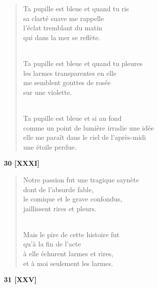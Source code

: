 \documentclass[a4paper,12pt]{book}
\begin{document}
\begin{verse}
Ta pupille est bleue et quand tu ris \\
sa clarté suave me rappelle \\
l'éclat tremblant du matin \\
qui dans la mer se reflète. \\ \

Ta pupille est bleue et quand tu pleures \\
les larmes transparentes en elle \\
me semblent gouttes de rosée \\
sur une violette. \\ \

Ta pupille est bleue et si au fond \\
comme un point de lumière irradie une idée \\
elle me paraît dans le ciel de l'après-midi \\
une étoile perdue. \\
\end{verse}

\bigskip

\begin{center} {\bf 30 [XXXI]} \end{center}

\begin{verse}
Notre passion fut une tragique saynète \\
dont de l'absurde fable, \\
le comique et le grave confondus, \\
jaillissent rires et pleurs. \\ \

Mais le pire de cette histoire fut \\
qu'à la fin de l'acte \\
à elle échurent larmes et rires, \\
et à moi seulement les larmes. \\
\end{verse}

\bigskip

\begin{center} {\bf 31 [XXV]} \end{center}
\end{document}
